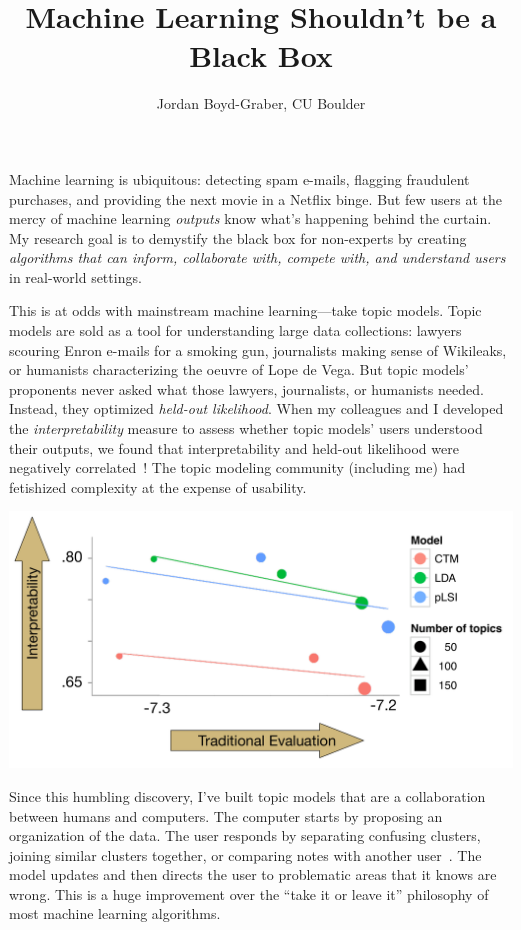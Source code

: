 \documentclass[11pt]{amsart}
\begin{document}
 \title{Machine Learning Shouldn't be a Black Box}

 \author{Jordan Boyd-Graber, CU Boulder}


\maketitle

Machine learning is ubiquitous: detecting spam e-mails, flagging fraudulent
purchases, and providing the next movie in a Netflix binge.  But few users at
the mercy of machine learning \emph{outputs} know what's happening behind the
curtain.  My research goal is to demystify the black box for non-experts by
creating \emph{algorithms that can inform, collaborate with, compete with, and
  understand users} in real-world settings.

This is at odds with mainstream machine learning---take topic models.  Topic
models are sold as a tool for understanding large data collections: lawyers
scouring Enron e-mails for a smoking gun, journalists making sense of Wikileaks,
or humanists characterizing the oeuvre of Lope de Vega.  But topic models'
proponents never asked what those lawyers, journalists, or humanists
needed. Instead, they optimized \emph{held-out likelihood}. When my colleagues
and I developed the \emph{interpretability} measure to assess whether topic
models' users understood their outputs, we found that interpretability and
held-out likelihood were negatively correlated~\cite{chang-09b}! The topic
modeling community (including me) had fetishized complexity at the expense of
usability.

\begin{center}
\includegraphics[width=.5\linewidth]{images/prec_ll_4}
\end{center}

Since this humbling discovery, I've built topic models that are a collaboration
between humans and computers.  The computer starts by proposing an organization
of the data.  The user responds by separating confusing clusters, joining
similar clusters together, or comparing notes with another
user~\cite{hu-14:itm}.  The model updates and then directs the user to
problematic areas that it knows are wrong.  This is a huge improvement over the
``take it or leave it'' philosophy of most machine learning algorithms.
\end{document}
